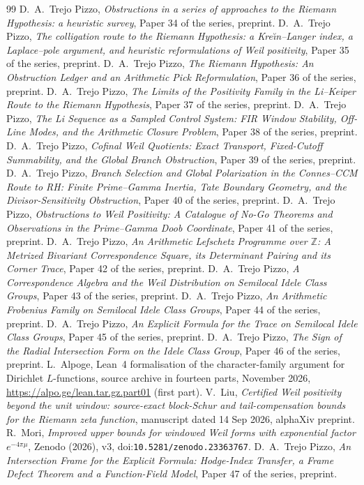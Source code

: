 \documentclass[11pt]{amsart}
\theoremstyle{definition}
\theoremstyle{remark}
\numberwithin{equation}{section}
\newcommand{\Z}{\mathbb{Z}}
\begin{document}
\begin{thebibliography}{99}
 D.~A.~Trejo Pizzo, \emph{Obstructions in a series of approaches to the Riemann Hypothesis: a heuristic survey}, Paper 34 of the series, preprint.
 D.~A.~Trejo Pizzo, \emph{The colligation route to the Riemann Hypothesis: a Kre\u{\i}n--Langer index, a Laplace--pole argument, and heuristic reformulations of Weil positivity}, Paper 35 of the series, preprint.
 D.~A.~Trejo Pizzo, \emph{The Riemann Hypothesis: An Obstruction Ledger and an Arithmetic Pick Reformulation}, Paper 36 of the series, preprint.
 D.~A.~Trejo Pizzo, \emph{The Limits of the Positivity Family in the Li--Keiper Route to the Riemann Hypothesis}, Paper 37 of the series, preprint.
 D.~A.~Trejo Pizzo, \emph{The Li Sequence as a Sampled Control System: FIR Window Stability, Off-Line Modes, and the Arithmetic Closure Problem}, Paper 38 of the series, preprint.
 D.~A.~Trejo Pizzo, \emph{Cofinal Weil Quotients: Exact Transport, Fixed-Cutoff Summability, and the Global Branch Obstruction}, Paper 39 of the series, preprint.
 D.~A.~Trejo Pizzo, \emph{Branch Selection and Global Polarization in the Connes--CCM Route to RH: Finite Prime--Gamma Inertia, Tate Boundary Geometry, and the Divisor-Sensitivity Obstruction}, Paper 40 of the series, preprint.
 D.~A.~Trejo Pizzo, \emph{Obstructions to Weil Positivity: A Catalogue of No-Go Theorems and Observations in the Prime--Gamma Doob Coordinate}, Paper 41 of the series, preprint.
 D.~A.~Trejo Pizzo, \emph{An Arithmetic Lefschetz Programme over $\Z$: A Metrized Bivariant Correspondence Square, its Determinant Pairing and its Corner Trace}, Paper 42 of the series, preprint.
 D.~A.~Trejo Pizzo, \emph{A Correspondence Algebra and the Weil Distribution on Semilocal Idele Class Groups}, Paper 43 of the series, preprint.
 D.~A.~Trejo Pizzo, \emph{An Arithmetic Frobenius Family on Semilocal Idele Class Groups}, Paper 44 of the series, preprint.
 D.~A.~Trejo Pizzo, \emph{An Explicit Formula for the Trace on Semilocal Idele Class Groups}, Paper 45 of the series, preprint.
 D.~A.~Trejo Pizzo, \emph{The Sign of the Radial Intersection Form on the Idele Class Group}, Paper 46 of the series, preprint.
 L.~Alpoge, Lean~4 formalisation of the character-family argument
for Dirichlet $L$-functions, source archive in fourteen parts, November 2026,
\url{https://alpo.ge/lean.tar.gz.part01} (first part).
 V.~Liu, \emph{Certified Weil positivity beyond the unit window: source-exact
block-Schur and tail-compensation bounds for the Riemann zeta function}, manuscript dated 14 Sep 2026,
alphaXiv preprint.
 R.~Mori, \emph{Improved upper bounds for windowed Weil forms with exponential factor
$e^{-4\pi\mu}$}, Zenodo (2026), v3, doi:\nolinkurl{10.5281/zenodo.23363767}.
 D.~A.~Trejo Pizzo, \emph{An Intersection Frame for the Explicit Formula: Hodge-Index Transfer, a Frame Defect Theorem and a Function-Field Model}, Paper 47 of the series, preprint.
\end{thebibliography}
\end{document}
